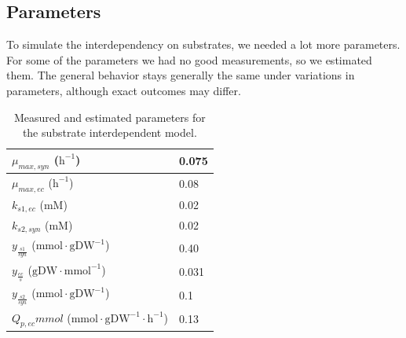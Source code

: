 \documentclass[12pt]{report}
\begin{document}
\subsection{Parameters}
To simulate the interdependency on substrates, we needed a lot more parameters. For some of the parameters we had no good measurements, so we estimated them. The general behavior stays generally the same under variations in parameters, although exact outcomes may differ.

\begin{table}[!ht]
 \begin{center}  
  \begin{tabular}{|l|l|}
   \hline
   $\mu_{max,syn}$ ($\text{h}^{-1}$) & 0.075 \\ \hline
   $\mu_{max,ec}$ ($\text{h}^{-1}$) & 0.08 \\ \hline
   $k_{s1,ec}$ ($\text{mM}$) & 0.02 \\ \hline
   $k_{s2,syn}$ ($\text{mM}$) & 0.02 \\ \hline
   $y_{\frac{s1}{syn}}$ ($\text{mmol}\cdot\text{gDW}^{-1}$) & 0.40 \\ \hline
   $y_{\frac{ec}{s}}$ ($\text{gDW}\cdot\text{mmol}^{-1}$) & 0.031 \\ \hline
   $y_{\frac{s2}{syn}}$ ($\text{mmol}\cdot\text{gDW}^{-1}$) & 0.1 \\ \hline
   $Q_{p,ec} mmol$ ($\text{mmol}\cdot \text{gDW}^{-1}\cdot\text{h}^{-1}$) & 0.13 \\
   \hline   
  \end{tabular}
  \caption{Measured and estimated parameters for the substrate interdependent model.}
  \label{tab:sdp}
 \end{center}
\end{table}
\end{document}
